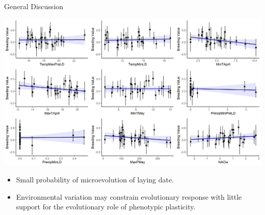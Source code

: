 \documentclass[compress]{beamer}
\begin{document}

\begin{frame}{General Discussion}

 \centering
 \includegraphics[height = 5.9 cm]{Chapter/BVVSenv.png}  \\
 \raggedright
 
  \begin{itemize}
\item <1->Small probability of microevolution of laying date.\\
\item <2->Environmental variation may constrain evolutionary response with little support for the  evolutionary role of phenotypic plasticity. 
\end{itemize}

\end{frame}
\end{document}
